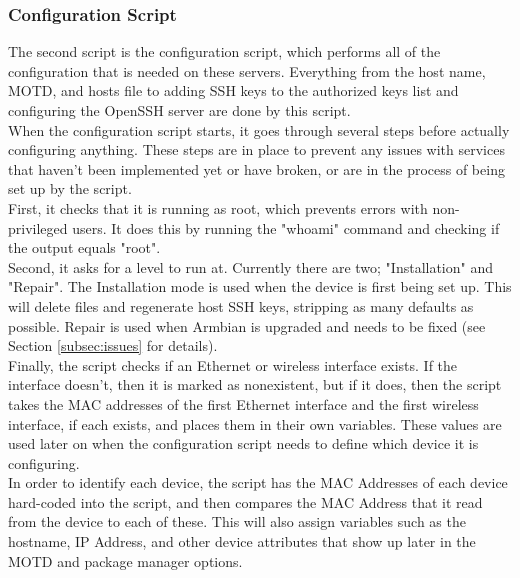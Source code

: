 \documentclass[12pt]{spieman}  %
\begin{document}
\subsubsection{Configuration Script}
\label{subsec:configuration}

The second script is the configuration script, which performs all of the configuration that is needed on these servers. Everything from the host name, MOTD, and hosts file to adding SSH keys to the authorized keys list and configuring the OpenSSH server are done by this script.\\

When the configuration script starts, it goes through several steps before actually configuring anything. These steps are in place to prevent any issues with services that haven't been implemented yet or have broken, or are in the process of being set up by the script.\\ 

First, it checks that it is running as root, which prevents errors with non-privileged users. It does this by running the "whoami" command and checking if the output equals "root".\\

Second, it asks for a level to run at. Currently there are two; "Installation" and "Repair". The Installation mode is used when the device is first being set up. This will delete files and regenerate host SSH keys, stripping as many defaults as possible. Repair is used when Armbian is upgraded and needs to be fixed (see Section \ref{subsec:issues} for details).\\

Finally, the script checks if an Ethernet or wireless interface exists. If the interface doesn't, then it is marked as nonexistent, but if it does, then the script takes the MAC addresses of the first Ethernet interface and the first wireless interface, if each exists, and places them in their own variables. These values are used later on when the configuration script needs to define which device it is configuring.\\

In order to identify each device, the script has the MAC Addresses of each device hard-coded into the script, and then compares the MAC Address that it read from the device to each of these. This will also assign variables such as the hostname, IP Address, and other device attributes that show up later in the MOTD and package manager options.\\
\end{document}
